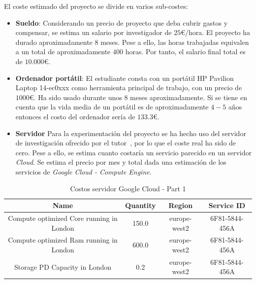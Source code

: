 El coste estimado del proyecto se divide en varios sub-costes:
\begin{itemize}
      \item \textbf{Sueldo}: Considerando un precio de proyecto que deba cubrir gastos y compensar, se estima un salario por investigador de $25$€/hora. El proyecto ha durado aproximadamente $8$ meses. Pese a ello, las horas trabajadas equivalen a un total de aproximadamente $400$ horas. Por tanto, el salario final total es de $10.000$€.
      \item \textbf{Ordenador portátil}: El estudiante consta con un portátil HP Pavilion Laptop 14-ec0xxx como herramienta principal de trabajo, con un precio de $1000$€. Ha sido usado durante unos $8$ meses aproximadamente. Si se tiene en cuenta que la vida media de un portátil es de aproximadamente $4-5$ años~\cite{woidasky_use_2021} entonces el costo del ordenador sería de $133.3$€.
      \item \textbf{Servidor} Para la experimentación del proyecto se ha hecho uso del servidor de investigación ofrecido por el tutor~\cite{citicugr}, por lo que el coste real ha sido de cero. Pese a ello, se estima cuanto costaría un servicio parecido en un servidor \textit{Cloud}. Se estima el precio por mes y total dada una estimación de los servicios de \textit{Google Cloud - Compute Engine}.
\end{itemize}
\begin{table}[htp]
      \centering
      \begin{adjustbox}{width=\linewidth}
            \begin{tabular}{|c|c|c|c|}
                  \hline
                  \textbf{Name}                            & \textbf{Quantity} & \textbf{Region} & \textbf{Service ID} \\
                  \hline
                  Compute optimized Core running in London & 150.0             & europe-west2    & 6F81-5844-456A      \\
                  Compute optimized Ram running in London  & 600.0             & europe-west2    & 6F81-5844-456A      \\
                  Storage PD Capacity in London            & 0.2               & europe-west2    & 6F81-5844-456A      \\
                  \hline
            \end{tabular}
      \end{adjustbox}
      \caption{Costos servidor Google Cloud - Part 1}
      \label{tab:server_costs_part1}
\end{table}
